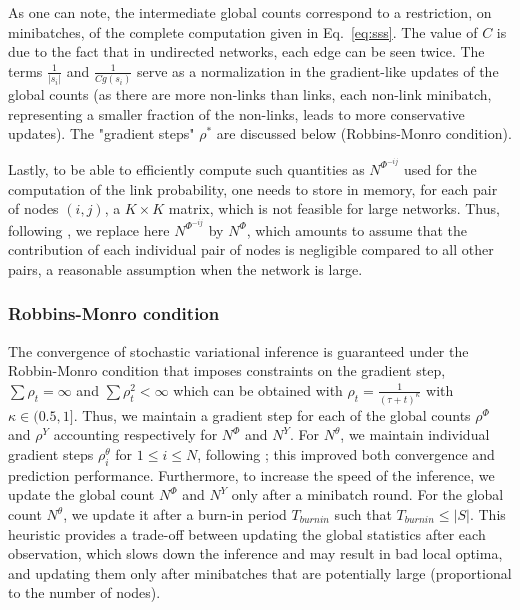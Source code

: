 %
As one can note, the intermediate global counts correspond to a restriction, on minibatches, of the complete computation given in Eq.~\ref{eq:sss}. The value of $C$ is due to the fact that in undirected networks, each edge can be seen twice. The terms $\frac{1}{|s_i|}$ and $\frac{1}{Cg(s_i)}$ serve as a normalization in the gradient-like updates of the global counts (as there are more non-links than links, each non-link minibatch, representing a smaller fraction of the non-links, leads to more conservative updates). The "gradient steps" $\rho^*$ are discussed below (Robbins-Monro condition).

Lastly, to be able to efficiently compute such quantities as $N^{\Phi^{-ij}}$ used for the computation of the link probability, one needs to store in memory, for each pair of nodes $(i,j)$, a $K \times K$ matrix, which is not feasible for large networks. Thus, following \cite{foulds2013stochastic}, we replace here $N^{\Phi^{-ij}}$ by $N^{\Phi}$, which amounts to assume that the contribution of each individual pair of nodes is negligible compared to all other pairs, a reasonable assumption when the network is large. %

\subsubsection{Robbins-Monro condition} 

The convergence of stochastic variational inference is guaranteed under the Robbin-Monro condition \cite{robbins1951stochastic} that imposes constraints on the gradient step, $\sum \rho_t = \infty$ and $\sum \rho_t^2 < \infty$ which can be obtained with $\rho_t = \frac{1}{(\tau +t)^\kappa}$ with $\kappa \in (0.5, 1]$. Thus, we maintain a gradient step for each of the global counts $\rho^\Phi$ and $\rho^{Y}$ accounting respectively for  $N^\Phi$ and $N^{Y}$. For $N^\theta$, we maintain individual gradient steps $\rho_i^{\theta}$ for $1\leq i\leq N$, following \cite{miller2009nonparametric}; this improved both convergence and prediction performance. Furthermore, to increase the speed of the inference, we update the global count $N^\Phi$ and $N^{Y}$ only after a minibatch round. For the global count  $N^\theta$, we update it after a burn-in period $T_{burnin}$ such that $T_{burnin} \leq |S|$.
This heuristic provides a trade-off between updating the global statistics after each observation, which slows down the inference and may result in bad local optima, and updating them only after minibatches that are potentially large (proportional to the number of nodes).

